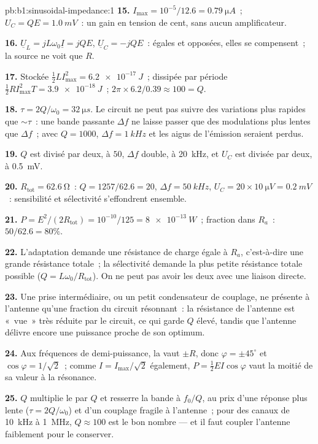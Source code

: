 \begin{solution}{pb:b1:sinusoidal-impedance:1}
\textbf{15.} $I_{\max} = 10^{-5}/12.6 = \qty{0.79}{\micro A}$~; $U_C = QE =
\qty{1.0}{mV}$~: un gain en tension de cent, sans aucun amplificateur.

\textbf{16.} $\underline U_L = jL\omega_0\underline I = jQE$, $\underline U_C
= -jQE$~: égales et opposées, elles se compensent~; la source ne voit que $R$.

\textbf{17.} Stockée $\tfrac12 LI_{\max}^2 = \qty{6.2e-17}{J}$~; dissipée
par période $\tfrac12 RI_{\max}^2T = \qty{3.9e-18}{J}$~; $2\pi \times 6.2/0.39
\approx 100 = Q$.

\textbf{18.} $\tau = 2Q/\omega_0 = \qty{32}{\micro s}$. Le circuit ne peut
pas suivre des variations plus rapides que $\sim\tau$~: une bande
passante $\Delta f$ ne laisse passer que des modulations plus lentes que
$\Delta f$~; avec $Q = 1000$, $\Delta f =
\qty{1}{kHz}$ et les aigus de l'émission seraient perdus.

\textbf{19.} $Q$ est divisé par deux, à $50$, $\Delta f$ double, à \qty{20}{kHz},
et $U_C$ est divisée par deux, à \qty{0.5}{mV}.

\textbf{20.} $R_{\text{tot}} = \qty{62.6}{\ohm}$~: $Q = 1257/62.6 = 20$,
$\Delta f = \qty{50}{kHz}$, $U_C = 20 \times \qty{10}{\micro V} = \qty{0.2}{mV}$~:
sensibilité et sélectivité s'effondrent ensemble.

\textbf{21.} $P = E^2/(2R_{\text{tot}}) = 10^{-10}/125 = \qty{8e-13}{W}$~;
fraction dans $R_a$~: $50/62.6 = 80\%$.

\textbf{22.} L'adaptation demande une résistance de charge égale à $R_a$,
c'est-à-dire une grande résistance totale~; la sélectivité demande la
plus petite résistance totale possible ($Q = L\omega_0/R_{\text{tot}}$).
On ne peut pas avoir les deux avec une liaison directe.

\textbf{23.} Une prise intermédiaire, ou un petit condensateur de
couplage, ne présente à l'antenne qu'une fraction du circuit résonnant~:
la résistance de l'antenne est «~vue~» très réduite par le circuit, ce
qui garde $Q$ élevé, tandis que l'antenne délivre encore une puissance
proche de son optimum.

\textbf{24.} Aux fréquences de demi-puissance, la  vaut $\pm R$,
donc $\varphi = \pm45^\circ$ et $\cos\varphi = 1/\sqrt2$~; comme $I =
I_{\max}/\sqrt2$ également, $P = \tfrac12 EI\cos\varphi$ vaut la moitié
de sa valeur à la résonance.

\textbf{25.} $Q$ multiplie le  par $Q$ et resserre la bande à
$f_0/Q$, au prix d'une réponse plus lente ($\tau = 2Q/\omega_0$) et d'un
couplage fragile à l'antenne~; pour des canaux de \qty{10}{kHz} à
\qty{1}{MHz}, $Q \approx 100$ est le bon nombre --- et il faut coupler
l'antenne faiblement pour le conserver.
\end{solution}
